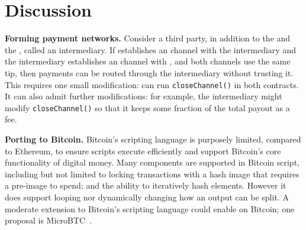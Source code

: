 


\section{Discussion}

\textbf{Forming payment networks.} Consider a third party, in addition to the \make and the \take, called an intermediary. If \make establishes an \ew channel with the intermediary and the intermediary establishes an \ew channel with \take, and both channels use the same tip, then payments can be routed through the intermediary without trusting it. This requires one small modification: \take can run \texttt{closeChannel()} in both contracts. It can also admit further modifications: for example, the intermediary might modify \texttt{closeChannel()} so that it keeps some fraction of the total payout as a fee.

\textbf{Porting to Bitcoin.} Bitcoin's scripting language is purposely limited, compared to Ethereum, to ensure scripts execute efficiently and support Bitcoin's core functionality of digital money. Many \pw components are supported in Bitcoin script, including but not limited to locking transactions with a hash image that requires a pre-image to spend; and the ability to iteratively hash elements. However it does support looping nor dynamically changing how an output can be split. A moderate extension to Bitcoin's scripting language could enable \pw on Bitcoin; one proposal is MicroBTC~\cite{Wan18}.

